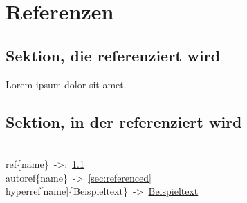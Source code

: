 \chapter{Referenzen}\label{ch:references}

\section{Sektion, die referenziert wird}\label{sec:referenced}
Lorem ipsum dolor sit amet.

\section{Sektion, in der referenziert wird}\label{sec:references}
\\ref\{name\}~->:~\ref{sec:referenced}
\\autoref\{name\}~->~\autoref{sec:referenced}
\\hyperref[name]\{Beispieltext\}~->~\hyperref[sec:referenced]{Beispieltext}